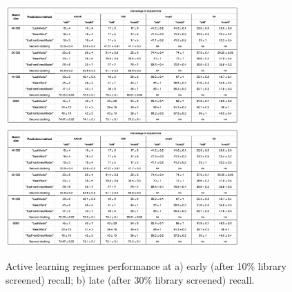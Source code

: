 \begin{figure}[h]
\centering
\includegraphics[width=0.8\textwidth]{tables/hits_0.1.png}
\includegraphics[width=0.8\textwidth]{tables/hits_0.1.png}
\caption{Active learning regimes performance at a) early (after 10\% library screened) recall; b) late (after 30\% library screened) recall.}
\label{tab:tab_1}
\end{figure}


